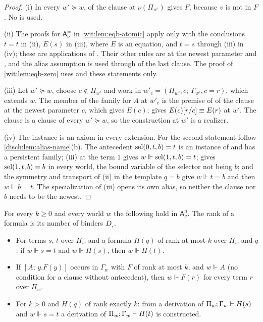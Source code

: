 \begin{proof}
(i) In every $w'\succeq w$,  of the clause at
$\nu(\Pi_{w'})$ gives $F$, because $v$ is not in $F$.  No 
is used.

(ii) The proofs for $\mathsf{A}^{=}_{\nu}$ in \cref{wit:lem:eqb-atomic}
apply  only with the conclusions $t=t$ in (ii), $E(s)$ in
(iii), where $E$ is an equation, and $t=s$ through (iii) in (iv); these are
applications of .  Their other rules are  at
the newest parameter and , and the alias assumption is used
through  of the last clause.  The proof of
\cref{wit:lem:eqb-zero} uses  and these statements only.

(iii) Let $w'\succeq w$, choose $c\notin\Pi_{w'}$ and work in
$w'_c=(\Pi_{w'},c;\ \Gamma_{w'},c=r)$, which extends $w$.  The member of the
family for $A$ at $w'_c$ is the premise of  of the clause at
the newest parameter $c$, which gives $E(c)$;  gives
$E(c)[r/c]\equiv E(r)$ at $w'$.  The clause is a clause of every
$w'\succeq w$, so the construction at $w'$ is a realizer.

(iv) The instance is an axiom in every extension.  For the second statement
follow \cref{disch:lem:alias-name}(b).  The antecedent $\operatorname{sel}(0,t,b)=t$ is an
instance of  and has a persistent family; (iii) at the term $1$
gives $w\Vdash\operatorname{sel}(1,t,b)=t$;  gives $\operatorname{sel}(1,t,b)=b$ in every
world, the bound variable of the selector not being $b$; and the symmetry and
transport of (ii) in the template $q=b$ give $w\Vdash t=b$ and then
$w\Vdash b=t$.  The specialization of (iii) opens its own alias, so neither
the clause nor $b$ needs to be the newest.
\end{proof}

\begin{theorem}
\label{wit:thm:ns-rank}
For every $k\ge 0$ and every world $w$ the following hold in
$\mathsf{A}^{\mathrm n}_{\nu}$.  The rank of a formula is its number of
binders $D_{,}$.
\begin{itemize}
\item[$(\mathrm T_k)$] For terms $s$, $t$ over $\Pi_w$ and a formula $H(q)$
 of rank at most $k$ over $\Pi_w$ and $q$: if $w\Vdash s=t$ and
 $w\Vdash H(s)$, then $w\Vdash H(t)$.
\item[$(\mathrm S_k)$] If $[A;\,y.F(y)]$ occurs in $\Gamma_w$ with $F$ of
 rank at most $k$, and $w\Vdash A$ (no condition for a clause without
 antecedent), then $w\Vdash F(r)$ for every term $r$ over $\Pi_w$.
\item[$(\mathrm L_k)$] For $k>0$ and $H(q)$ of rank exactly $k$: from a
 derivation of $\Pi_w;\Gamma_w\vdash H(s)$ and $w\Vdash s=t$ a derivation
 of $\Pi_w;\Gamma_w\vdash H(t)$ is constructed.
\end{itemize}
\end{theorem}

